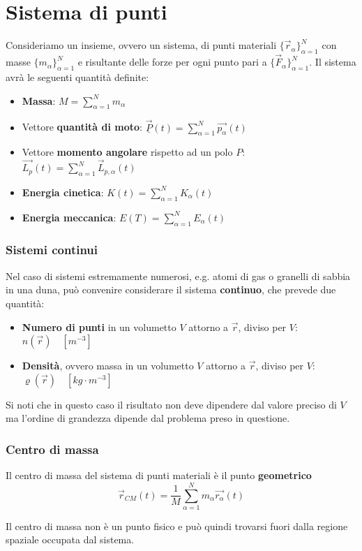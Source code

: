 \newpage
\section{Sistema di punti}
Consideriamo un insieme, ovvero un sistema, di punti materiali $\{\vec{r}_\alpha\}_{\alpha=1}^N$ con masse $\{m_\alpha\}_{\alpha=1}^N$ e risultante delle forze per ogni punto pari a $\{\vec{F}_\alpha\}_{\alpha=1}^N$. Il sistema avrà le seguenti quantità definite:
\begin{itemize}
	\item \textbf{Massa}: $M = \sum_{\alpha=1}^{N}m_\alpha$
	\item Vettore \textbf{quantità di moto}: $\underline{\vec{P}}(t) = \sum_{\alpha=1}^{N}\vec{p_\alpha}(t)$
	\item Vettore \textbf{momento angolare} rispetto ad un polo $P$: $\vec{L_p}(t) = \sum_{\alpha=1}^N \vec{L}_{p, \alpha}(t)$
	\item \textbf{Energia cinetica}: $K(t) = \sum_{\alpha=1}^NK_\alpha(t)$
	\item \textbf{Energia meccanica}: $E(T) = \sum_{\alpha=1}^N E_\alpha(t)$
\end{itemize}
\subsubsection{Sistemi continui}
Nel caso di sistemi estremamente numerosi, e.g. atomi di gas o granelli di sabbia in una duna, può convenire considerare il sistema \textbf{continuo}, che prevede due quantità:
\begin{itemize}
	\item \textbf{Numero di punti} in un volumetto $V$ attorno a $\vec{r}$, diviso per $V$: $n(\vec{r}) \quad [m^{-3}]$
	\item \textbf{Densità}, ovvero massa in un volumetto $V$ attorno a $\vec{r}$, diviso per $V$: $\varrho(\vec{r}) \quad [kg \cdot m^{-3}]$
\end{itemize}
Si noti che in questo caso il risultato non deve dipendere dal valore preciso di $V$ ma l'ordine di grandezza dipende dal problema preso in questione.

\subsubsection{Centro di massa}
Il centro di massa del sistema di punti materiali è il punto \textbf{geometrico}
\begin{equation}
	\label{eq:cm}
	\vec{r}_{CM}(t) = \frac{1}{M}\sum_{\alpha=1}^N m_\alpha\vec{r_\alpha}(t)
\end{equation}
\begin{observation}
	Il centro di massa non è un punto fisico e può quindi trovarsi fuori dalla regione spaziale occupata dal sistema.
\end{observation}

